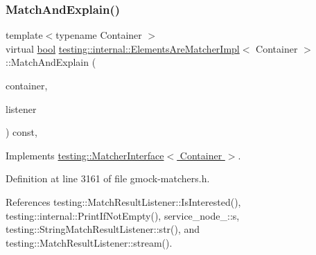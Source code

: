 \subsubsection{\texorpdfstring{Match\+And\+Explain()}{MatchAndExplain()}}
{\footnotesize\ttfamily template$<$typename Container $>$ \\
virtual \hyperlink{classbool}{bool} \hyperlink{classtesting_1_1internal_1_1ElementsAreMatcherImpl}{testing\+::internal\+::\+Elements\+Are\+Matcher\+Impl}$<$ Container $>$\+::Match\+And\+Explain (\begin{DoxyParamCaption}\item[{Container}]{container,  }\item[{\hyperlink{classtesting_1_1MatchResultListener}{Match\+Result\+Listener} $\ast$}]{listener }\end{DoxyParamCaption}) const\hspace{0.3cm}{\ttfamily [inline]}, {\ttfamily [virtual]}}



Implements \hyperlink{classtesting_1_1MatcherInterface_a296b43607cd99d60365f0e6a762777cf}{testing\+::\+Matcher\+Interface$<$ Container $>$}.



Definition at line 3161 of file gmock-\/matchers.\+h.



References testing\+::\+Match\+Result\+Listener\+::\+Is\+Interested(), testing\+::internal\+::\+Print\+If\+Not\+Empty(), service\+\_\+node\+\_\+::s, testing\+::\+String\+Match\+Result\+Listener\+::str(), and testing\+::\+Match\+Result\+Listener\+::stream().


